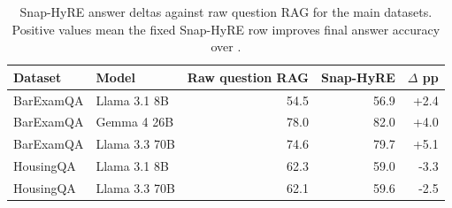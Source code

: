 \begin{table}[t]
\centering
\caption{Snap-HyRE answer deltas against raw question RAG for the main datasets. Positive values mean the fixed Snap-HyRE row improves final answer accuracy over .}
\label{tab:snap_deltas}
\small
\begin{tabular}{llrrr}
\toprule
Dataset & Model & Raw question RAG & Snap-HyRE & $\Delta$ pp \\
\midrule
BarExamQA & Llama 3.1 8B & 54.5 & 56.9 & +2.4 \\
BarExamQA & Gemma 4 26B & 78.0 & 82.0 & +4.0 \\
BarExamQA & Llama 3.3 70B & 74.6 & 79.7 & +5.1 \\
HousingQA & Llama 3.1 8B & 62.3 & 59.0 & -3.3 \\
HousingQA & Llama 3.3 70B & 62.1 & 59.6 & -2.5 \\
\bottomrule
\end{tabular}
\end{table}
